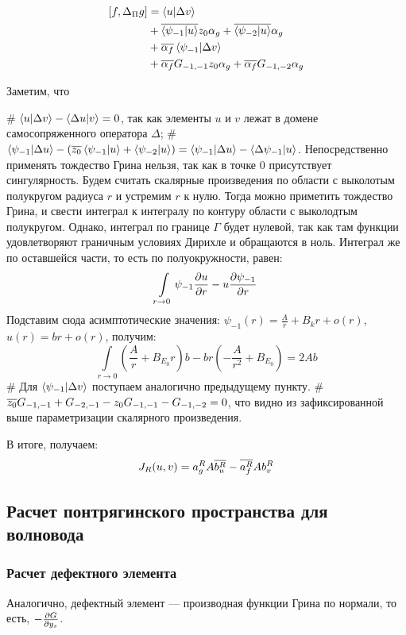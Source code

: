 \begin{align*}
\iip{f}{\Delta_\Pi  g}
&= \ip{u}{\Delta v} \\
&+ \cconj{\ip{\psi_{-1}}{u}} z_0 \alpha_g + \cconj{\ip{\psi_{-2}}{u}} \alpha_g \\
&+ \cconj{\alpha_f} \ip{\psi_{-1}}{\Delta v} \\
&+ \cconj{\alpha_f} G_{-1, -1} z_0 \alpha_g + \cconj{\alpha_f} G_{-1, -2} \alpha_g 
\end{align*}

Заметим, что
\begin{elist}
# $\ip{u}{\Delta v} - \ip{\Delta u}{v} = 0$, так как элементы $u$ и $v$ лежат в домене самосопряженного оператора $\Delta$;
# $\ip{\psi_{-1}}{\Delta u} - (\cconj{z_0} \ip{\psi_{-1}}{u} + \ip{\psi_{-2}}{u}) = \ip{\psi_{-1}}{\Delta u} - \ip{\Delta \psi_{-1}}{u}$. Непосредственно применять тождество Грина нельзя, так как в точке $0$ присутствует сингулярность. Будем считать скалярные произведения по области с выколотым полукругом радиуса $r$ и устремим $r$ к нулю. Тогда можно приметить тождество Грина, и свести интеграл к интегралу по контуру области с выколодтым полукругом. Однако, интеграл по границе $\Gamma$ будет нулевой, так как там функции удовлетворяют граничным условиях Дирихле и обращаются в ноль. Интеграл же по оставшейся части, то есть по полуокружности, равен: 
\[
\int\limits_{r \to 0} \psi_{-1} \pdv{u}{r} - u \pdv{\psi_{-1}}{r}
\]
Подставим сюда асимптотические значения: $\psi_{-1}(r) = \frac{A}{r} + B_k r + o(r)$, $u(r) = b r + o(r)$, получим:
\[
\int\limits_{r \to 0} \left( \frac{A}{r} + B_{E_0} r \right) b - b r \left( -\frac{A}{r^2} + B_{E_0} \right) = 2 A b
\]
# Для $\ip{\psi_{-1}}{\Delta v}$ поступаем аналогично предыдущему пункту.
# $\overline{z_0} G_{-1, -1} + G_{-2, -1} - z_0 G_{-1, -1} - G_{-1, -2} = 0$, что видно из зафиксированной выше параметризации скалярного произведения.
\end{elist}
В итоге, получаем:
\begin{align*}
J_R(u, v) = a^R_g A \overline{b^R_u} - \overline{a^R_f} A b^R_v 
\end{align*}

\subsection{Расчет понтрягинского пространства для волновода}
\subsubsection{Расчет дефектного элемента}
Аналогично, дефектный элемент — производная функции Грина по нормали, то есть, $-\pdv{G}{y_s}$.


